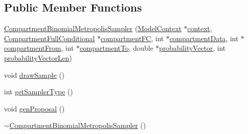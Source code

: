 \subsection*{Public Member Functions}
\begin{DoxyCompactItemize}
\item 
\hyperlink{classSpatialSEIR_1_1CompartmentBinomialMetropolisSampler_a8098fe4333db437ebd754d67040fc758}{Compartment\-Binomial\-Metropolis\-Sampler} (\hyperlink{classSpatialSEIR_1_1ModelContext}{Model\-Context} $\ast$\hyperlink{classSpatialSEIR_1_1CompartmentBinomialMetropolisSampler_aa8e8332272c23e296ff8f3f6d9b6b9a2}{context}, \hyperlink{classSpatialSEIR_1_1CompartmentFullConditional}{Compartment\-Full\-Conditional} $\ast$\hyperlink{classSpatialSEIR_1_1CompartmentBinomialMetropolisSampler_a5ba83648853edd9ccf7e0e33e22b1d93}{compartment\-F\-C}, int $\ast$\hyperlink{classSpatialSEIR_1_1CompartmentBinomialMetropolisSampler_a05f080ab0846309ba240b1819249cb9c}{compartment\-Data}, int $\ast$\hyperlink{classSpatialSEIR_1_1CompartmentBinomialMetropolisSampler_a2927a09c8c50447fe863506c1e6e1a10}{compartment\-From}, int $\ast$\hyperlink{classSpatialSEIR_1_1CompartmentBinomialMetropolisSampler_a4b6410cc9b98d13ef261497292ba6518}{compartment\-To}, double $\ast$\hyperlink{classSpatialSEIR_1_1CompartmentBinomialMetropolisSampler_a6a93966308715d47f53c972b5f7e385b}{probability\-Vector}, int \hyperlink{classSpatialSEIR_1_1CompartmentBinomialMetropolisSampler_adad677ace3b19726b377834fcd78b857}{probability\-Vector\-Len})
\item 
void \hyperlink{classSpatialSEIR_1_1CompartmentBinomialMetropolisSampler_a11d2900ff89a59f71e2ff5695432e036}{draw\-Sample} ()
\item 
int \hyperlink{classSpatialSEIR_1_1CompartmentBinomialMetropolisSampler_aa84f51d4d02943be01c6309581ecc17a}{get\-Sampler\-Type} ()
\item 
void \hyperlink{classSpatialSEIR_1_1CompartmentBinomialMetropolisSampler_a3ba10e64272f38123df2963e9d52cdab}{gen\-Proposal} ()
\item 
\hyperlink{classSpatialSEIR_1_1CompartmentBinomialMetropolisSampler_aae485cd96f34f762416337db11da1f54}{$\sim$\-Compartment\-Binomial\-Metropolis\-Sampler} ()
\end{DoxyCompactItemize}
